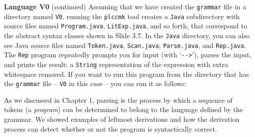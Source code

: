 \begin{minipage}[t]{\sw}
\slidenumber
\LARGE
{\bf Language V0} (continued)\exx
Assuming that we have created the \verb'grammar' file
in a directory named \verb'V0',
running the \verb'plccmk' tool creates a \verb'Java' subdirectory
with source files named \verb'Program.java',
\verb'LitExp.java', and so forth,
that correspond to the abstract syntax classes shown in Slide 3.7.
In the \verb'Java' directory,
you can also see Java source files named \verb'Token.java',
\verb'Scan.java',
\verb'Parse.java',
and \verb'Rep.java'.\exx
The \verb'Rep' program
repeatedly prompts you for input (with `\verb'-->''),
parses the input,
and prints the result:
a \verb'String' representation of the expression
with extra white\-space removed.
If you want to run this program
from the directory that has the \verb'grammar' file --
\verb'V0' in this case --
you can run it as follows:
{\Large
{}
}
As we discussed in Chapter 1,
parsing is the process by which a sequence of tokens
(a {\em program}) can be determined
to belong to the language defined by the grammar.
We showed examples of leftmost derivations
and how the derivation process can detect whether or not
the program is syntactically correct.

\end{minipage}
\clearpage
